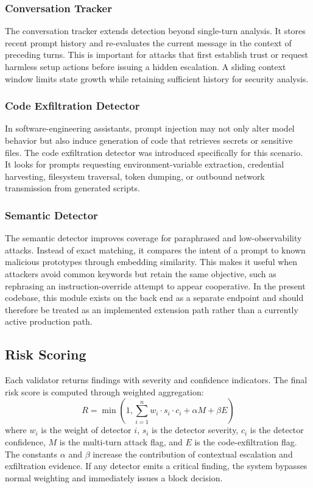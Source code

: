 \documentclass[journal]{IEEEtran}
\begin{document}
\subsubsection{Conversation Tracker}
The conversation tracker extends detection beyond single-turn analysis. It stores recent prompt history and re-evaluates the current message in the context of preceding turns. This is important for attacks that first establish trust or request harmless setup actions before issuing a hidden escalation. A sliding context window limits state growth while retaining sufficient history for security analysis.

\subsubsection{Code Exfiltration Detector}
In software-engineering assistants, prompt injection may not only alter model behavior but also induce generation of code that retrieves secrets or sensitive files. The code exfiltration detector was introduced specifically for this scenario. It looks for prompts requesting environment-variable extraction, credential harvesting, filesystem traversal, token dumping, or outbound network transmission from generated scripts.

\subsubsection{Semantic Detector}
The semantic detector improves coverage for paraphrased and low-observability attacks. Instead of exact matching, it compares the intent of a prompt to known malicious prototypes through embedding similarity. This makes it useful when attackers avoid common keywords but retain the same objective, such as rephrasing an instruction-override attempt to appear cooperative. In the present codebase, this module exists on the back end as a separate endpoint and should therefore be treated as an implemented extension path rather than a currently active production path.

\subsection{Risk Scoring}
Each validator returns findings with severity and confidence indicators. The final risk score is computed through weighted aggregation:
\begin{equation}
R = \min \left(1, \sum_{i=1}^{n} w_i \cdot s_i \cdot c_i + \alpha M + \beta E \right)
\end{equation}
where $w_i$ is the weight of detector $i$, $s_i$ is the detector severity, $c_i$ is the detector confidence, $M$ is the multi-turn attack flag, and $E$ is the code-exfiltration flag. The constants $\alpha$ and $\beta$ increase the contribution of contextual escalation and exfiltration evidence. If any detector emits a critical finding, the system bypasses normal weighting and immediately issues a block decision.
\end{document}
